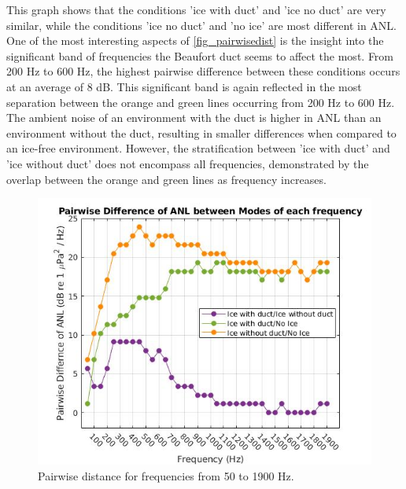 This graph shows that the conditions 'ice with duct' and 'ice no duct' are very similar, while the conditions 'ice no duct' and 'no ice' are most different in ANL. One of the most interesting aspects of \autoref{fig_pairwisedist} is the insight into the significant band of frequencies the Beaufort duct seems to affect the most. From 200 Hz to 600 Hz, the highest pairwise difference between these conditions occurs at an average of 8 dB. This significant band is again reflected in the most separation between the orange and green lines occurring from 200 Hz to 600 Hz. The ambient noise of an environment with the duct is higher in ANL than an environment without the duct, resulting in smaller differences when compared to an ice-free environment. However, the stratification between 'ice with duct' and 'ice without duct' does not encompass all frequencies, demonstrated by the overlap between the orange and green lines as frequency increases.

\begin{figure}[p]
\centering
\includegraphics[scale=0.6]{Figures/recolor_pairwise_dist_ANLs.jpg}
\caption{Pairwise distance for frequencies from 50 to 1900 Hz.}
\label{fig_pairwisedist}
\end{figure}

